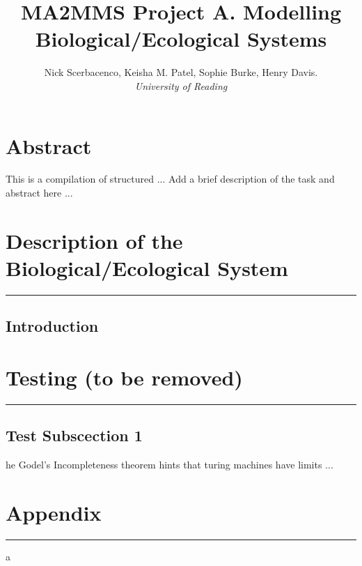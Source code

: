\documentclass[11pt]{article}
\title{\textbf{MA2MMS Project A. Modelling Biological/Ecological Systems}}
\author{Nick Scerbacenco, Keisha M. Patel, Sophie Burke, Henry Davis. \\
        \textit{University of Reading}}
\date{ }
\begin{document}
\pagestyle{fancy}


\maketitle
\thispagestyle{empty} 

\section*{\textbf{Abstract}}
This is a compilation of structured ... Add a brief description of the task and abstract here ...

\tableofcontents

\newpage


\section{Description of the Biological/Ecological System}
\hrule height 0.8pt 
\vspace{5mm}

\subsection{Introduction}


\newpage
\section{Testing (to be removed)}
\hrule height 0.8pt 
\vspace{5mm}

\subsection{Test Subscection 1}

\lettrine[findent=2pt]{}{ } he Godel's Incompleteness theorem hints that turing machines have limits ...


\newpage 
\section*{Appendix}
\hrule height 0.8pt 
\vspace{5mm}

a

\end{document}
